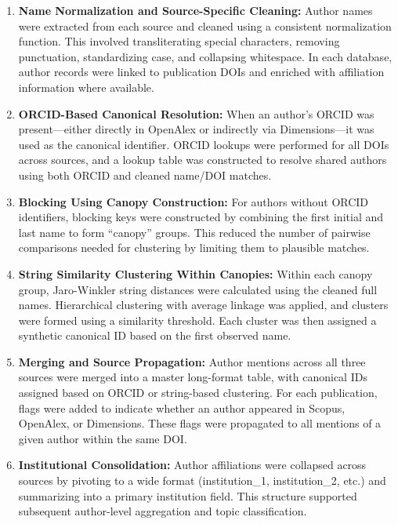 \documentclass[
  letterpaper,
  DIV=11,
  numbers=noendperiod]{scrartcl}
\begin{document}
\begin{enumerate}
\def\labelenumi{\arabic{enumi}.}
\item
  \textbf{Name Normalization and Source-Specific Cleaning:} Author names
  were extracted from each source and cleaned using a consistent
  normalization function. This involved transliterating special
  characters, removing punctuation, standardizing case, and collapsing
  whitespace. In each database, author records were linked to
  publication DOIs and enriched with affiliation information where
  available.
\item
  \textbf{ORCID-Based Canonical Resolution:} When an author's ORCID was
  present---either directly in OpenAlex or indirectly via
  Dimensions---it was used as the canonical identifier. ORCID lookups
  were performed for all DOIs across sources, and a lookup table was
  constructed to resolve shared authors using both ORCID and cleaned
  name/DOI matches.
\item
  \textbf{Blocking Using Canopy Construction:} For authors without ORCID
  identifiers, blocking keys were constructed by combining the first
  initial and last name to form ``canopy'' groups. This reduced the
  number of pairwise comparisons needed for clustering by limiting them
  to plausible matches.
\item
  \textbf{String Similarity Clustering Within Canopies:} Within each
  canopy group, Jaro-Winkler string distances were calculated using the
  cleaned full names. Hierarchical clustering with average linkage was
  applied, and clusters were formed using a similarity threshold. Each
  cluster was then assigned a synthetic canonical ID based on the first
  observed name.
\item
  \textbf{Merging and Source Propagation:} Author mentions across all
  three sources were merged into a master long-format table, with
  canonical IDs assigned based on ORCID or string-based clustering. For
  each publication, flags were added to indicate whether an author
  appeared in Scopus, OpenAlex, or Dimensions. These flags were
  propagated to all mentions of a given author within the same DOI.
\item
  \textbf{Institutional Consolidation:} Author affiliations were
  collapsed across sources by pivoting to a wide format (institution\_1,
  institution\_2, etc.) and summarizing into a primary institution
  field. This structure supported subsequent author-level aggregation
  and topic classification.
\end{enumerate}
\end{document}

